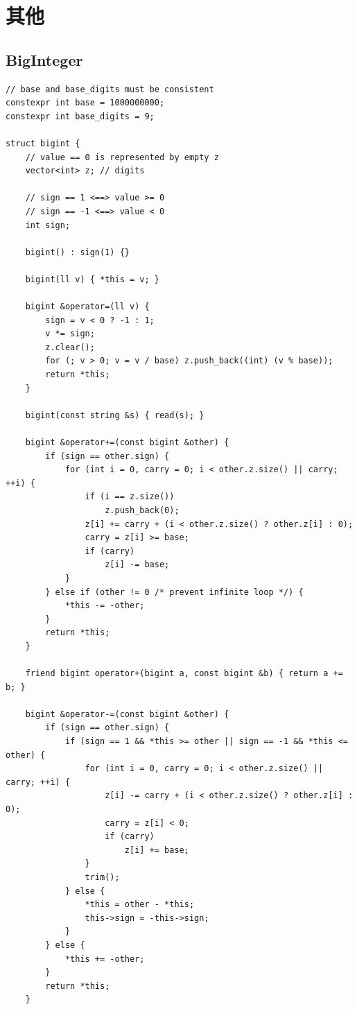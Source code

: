 \documentclass[twoside]{article}
\begin{document}
\clearpage\section{其他}
\subsection{BigInteger}
\begin{lstlisting}
// base and base_digits must be consistent
constexpr int base = 1000000000;
constexpr int base_digits = 9;

struct bigint {
    // value == 0 is represented by empty z
    vector<int> z; // digits

    // sign == 1 <==> value >= 0
    // sign == -1 <==> value < 0
    int sign;

    bigint() : sign(1) {}

    bigint(ll v) { *this = v; }

    bigint &operator=(ll v) {
        sign = v < 0 ? -1 : 1;
        v *= sign;
        z.clear();
        for (; v > 0; v = v / base) z.push_back((int) (v % base));
        return *this;
    }

    bigint(const string &s) { read(s); }

    bigint &operator+=(const bigint &other) {
        if (sign == other.sign) {
            for (int i = 0, carry = 0; i < other.z.size() || carry; ++i) {
                if (i == z.size())
                    z.push_back(0);
                z[i] += carry + (i < other.z.size() ? other.z[i] : 0);
                carry = z[i] >= base;
                if (carry)
                    z[i] -= base;
            }
        } else if (other != 0 /* prevent infinite loop */) {
            *this -= -other;
        }
        return *this;
    }

    friend bigint operator+(bigint a, const bigint &b) { return a += b; }

    bigint &operator-=(const bigint &other) {
        if (sign == other.sign) {
            if (sign == 1 && *this >= other || sign == -1 && *this <= other) {
                for (int i = 0, carry = 0; i < other.z.size() || carry; ++i) {
                    z[i] -= carry + (i < other.z.size() ? other.z[i] : 0);
                    carry = z[i] < 0;
                    if (carry)
                        z[i] += base;
                }
                trim();
            } else {
                *this = other - *this;
                this->sign = -this->sign;
            }
        } else {
            *this += -other;
        }
        return *this;
    }


\end{lstlisting}
\end{document}
